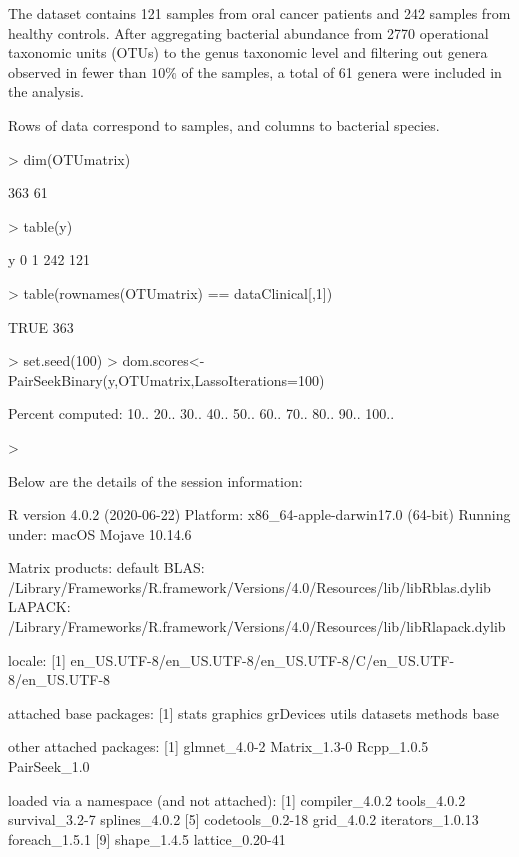 \documentclass[11pt]{article}
\begin{document}
The dataset contains 121 samples from oral cancer patients and 242 samples from healthy controls. After aggregating bacterial abundance from 2770 operational taxonomic units (OTUs) to the genus taxonomic level and filtering out genera observed in fewer than $10\%$ of the samples,  a total of 61 genera were included in the analysis.

Rows of data correspond to samples, and columns to bacterial species.


\begin{Schunk}
\begin{Sinput}
> dim(OTUmatrix)
\end{Sinput}
\begin{Soutput}
[1] 363  61
\end{Soutput}
\begin{Sinput}
> table(y)
\end{Sinput}
\begin{Soutput}
y
  0   1 
242 121 
\end{Soutput}
\begin{Sinput}
> table(rownames(OTUmatrix)  == dataClinical[,1])
\end{Sinput}
\begin{Soutput}
TRUE 
 363 
\end{Soutput}
\end{Schunk}


\begin{Schunk}
\begin{Sinput}
> set.seed(100)
> dom.scores<-PairSeekBinary(y,OTUmatrix,LassoIterations=100)
\end{Sinput}
\begin{Soutput}
Percent computed: 10.. 20.. 30.. 40.. 50.. 60.. 70.. 80.. 90.. 100.. 
\end{Soutput}
\begin{Sinput}
> 
\end{Sinput}
\end{Schunk}


Below are the details of the session information:
\begin{Schunk}
\begin{Soutput}
R version 4.0.2 (2020-06-22)
Platform: x86_64-apple-darwin17.0 (64-bit)
Running under: macOS Mojave 10.14.6

Matrix products: default
BLAS:   /Library/Frameworks/R.framework/Versions/4.0/Resources/lib/libRblas.dylib
LAPACK: /Library/Frameworks/R.framework/Versions/4.0/Resources/lib/libRlapack.dylib

locale:
[1] en_US.UTF-8/en_US.UTF-8/en_US.UTF-8/C/en_US.UTF-8/en_US.UTF-8

attached base packages:
[1] stats     graphics  grDevices utils     datasets  methods   base     

other attached packages:
[1] glmnet_4.0-2 Matrix_1.3-0 Rcpp_1.0.5   PairSeek_1.0

loaded via a namespace (and not attached):
 [1] compiler_4.0.2   tools_4.0.2      survival_3.2-7   splines_4.0.2   
 [5] codetools_0.2-18 grid_4.0.2       iterators_1.0.13 foreach_1.5.1   
 [9] shape_1.4.5      lattice_0.20-41 
\end{Soutput}
\end{Schunk}

% 
% 
\end{document}
